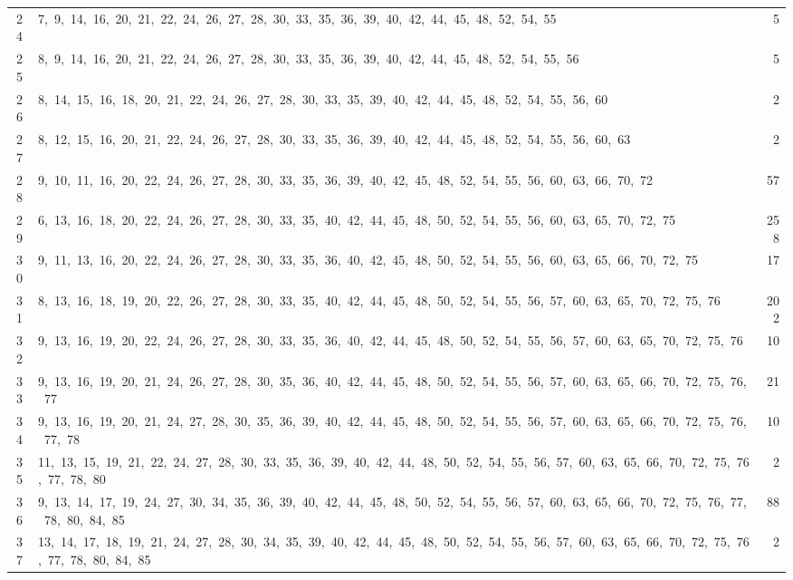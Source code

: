 \begin{longtable}{c|p{}|r}
24 & 7,\ 9,\ 14,\ 16,\ 20,\ 21,\ 22,\ 24,\ 26,\ 27,\ 28,\ 30,\ 33,\ 35,\ 36,\ 39,\ 40,\ 42,\ 44,\ 45,\ 48,\ 52,\ 54,\ 55 & 5 \\
25 & 8,\ 9,\ 14,\ 16,\ 20,\ 21,\ 22,\ 24,\ 26,\ 27,\ 28,\ 30,\ 33,\ 35,\ 36,\ 39,\ 40,\ 42,\ 44,\ 45,\ 48,\ 52,\ 54,\ 55,\ 56 & 5 \\
26 & 8,\ 14,\ 15,\ 16,\ 18,\ 20,\ 21,\ 22,\ 24,\ 26,\ 27,\ 28,\ 30,\ 33,\ 35,\ 39,\ 40,\ 42,\ 44,\ 45,\ 48,\ 52,\ 54,\ 55,\ 56,\ 60 & 2 \\
27 & 8,\ 12,\ 15,\ 16,\ 20,\ 21,\ 22,\ 24,\ 26,\ 27,\ 28,\ 30,\ 33,\ 35,\ 36,\ 39,\ 40,\ 42,\ 44,\ 45,\ 48,\ 52,\ 54,\ 55,\ 56,\ 60,\ 63 & 2 \\
28 & 9,\ 10,\ 11,\ 16,\ 20,\ 22,\ 24,\ 26,\ 27,\ 28,\ 30,\ 33,\ 35,\ 36,\ 39,\ 40,\ 42,\ 45,\ 48,\ 52,\ 54,\ 55,\ 56,\ 60,\ 63,\ 66,\ 70,\ 72 & 57 \\
29 & 6,\ 13,\ 16,\ 18,\ 20,\ 22,\ 24,\ 26,\ 27,\ 28,\ 30,\ 33,\ 35,\ 40,\ 42,\ 44,\ 45,\ 48,\ 50,\ 52,\ 54,\ 55,\ 56,\ 60,\ 63,\ 65,\ 70,\ 72,\ 75 & 258 \\
30 & 9,\ 11,\ 13,\ 16,\ 20,\ 22,\ 24,\ 26,\ 27,\ 28,\ 30,\ 33,\ 35,\ 36,\ 40,\ 42,\ 45,\ 48,\ 50,\ 52,\ 54,\ 55,\ 56,\ 60,\ 63,\ 65,\ 66,\ 70,\ 72,\ 75 & 17 \\
31 & 8,\ 13,\ 16,\ 18,\ 19,\ 20,\ 22,\ 26,\ 27,\ 28,\ 30,\ 33,\ 35,\ 40,\ 42,\ 44,\ 45,\ 48,\ 50,\ 52,\ 54,\ 55,\ 56,\ 57,\ 60,\ 63,\ 65,\ 70,\ 72,\ 75,\ 76 & 202 \\
32 & 9,\ 13,\ 16,\ 19,\ 20,\ 22,\ 24,\ 26,\ 27,\ 28,\ 30,\ 33,\ 35,\ 36,\ 40,\ 42,\ 44,\ 45,\ 48,\ 50,\ 52,\ 54,\ 55,\ 56,\ 57,\ 60,\ 63,\ 65,\ 70,\ 72,\ 75,\ 76 & 10 \\
33 & 9,\ 13,\ 16,\ 19,\ 20,\ 21,\ 24,\ 26,\ 27,\ 28,\ 30,\ 35,\ 36,\ 40,\ 42,\ 44,\ 45,\ 48,\ 50,\ 52,\ 54,\ 55,\ 56,\ 57,\ 60,\ 63,\ 65,\ 66,\ 70,\ 72,\ 75,\ 76,\ 77 & 21 \\
34 & 9,\ 13,\ 16,\ 19,\ 20,\ 21,\ 24,\ 27,\ 28,\ 30,\ 35,\ 36,\ 39,\ 40,\ 42,\ 44,\ 45,\ 48,\ 50,\ 52,\ 54,\ 55,\ 56,\ 57,\ 60,\ 63,\ 65,\ 66,\ 70,\ 72,\ 75,\ 76,\ 77,\ 78 & 10 \\
35 & 11,\ 13,\ 15,\ 19,\ 21,\ 22,\ 24,\ 27,\ 28,\ 30,\ 33,\ 35,\ 36,\ 39,\ 40,\ 42,\ 44,\ 48,\ 50,\ 52,\ 54,\ 55,\ 56,\ 57,\ 60,\ 63,\ 65,\ 66,\ 70,\ 72,\ 75,\ 76,\ 77,\ 78,\ 80 & 2 \\
36 & 9,\ 13,\ 14,\ 17,\ 19,\ 24,\ 27,\ 30,\ 34,\ 35,\ 36,\ 39,\ 40,\ 42,\ 44,\ 45,\ 48,\ 50,\ 52,\ 54,\ 55,\ 56,\ 57,\ 60,\ 63,\ 65,\ 66,\ 70,\ 72,\ 75,\ 76,\ 77,\ 78,\ 80,\ 84,\ 85 & 88 \\
37 & 13,\ 14,\ 17,\ 18,\ 19,\ 21,\ 24,\ 27,\ 28,\ 30,\ 34,\ 35,\ 39,\ 40,\ 42,\ 44,\ 45,\ 48,\ 50,\ 52,\ 54,\ 55,\ 56,\ 57,\ 60,\ 63,\ 65,\ 66,\ 70,\ 72,\ 75,\ 76,\ 77,\ 78,\ 80,\ 84,\ 85 & 2 \\

\end{longtable}
